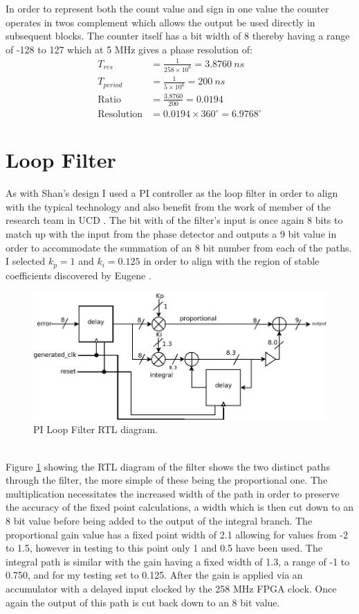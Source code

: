 \documentclass[11pt,english,british]{report}
\begin{document}
In order to represent both the count value and sign in one value the counter operates in twos complement which allows the output be used directly in subsequent blocks. The counter itself has a bit width of 8 thereby having a range of -128 to 127 which at 5 MHz gives a phase resolution of:
\begin{align*}
	T_{res} &= \frac{1}{258\times 10^6} = 3.8760~ns \\
	T_{period} &= \frac{1}{5\times 10^6} = 200~ns \\
	\textrm{Ratio} &=\frac{3.8760}{200} = 0.0194 \\
	\textrm{Resolution} & = 0.0194\times 360^\circ = 6.9768^\circ
\end{align*}

\section{Loop Filter}
As with Shan's design I used a PI controller as the loop filter in order to align with the typical technology and also benefit from the work of member of the research team in UCD \cite{shan2014phd,koskin2018generation}. %
The bit with of the filter's input is once again 8 bits to match up with the input from the phase detector and outputs a 9 bit value in order to accommodate the summation of an 8 bit number from each of the paths. I selected $k_p = 1$ and $k_i = 0.125$ in order to align with the region of stable coefficients discovered by Eugene \cite{koskin2018generation}. %
\begin{figure}[h]
	\centering
	\includegraphics[scale=0.35]{../loop_filter}
	\caption{PI Loop Filter RTL diagram.}
	\label{fig:my_pi}
\end{figure}\\
Figure \ref{fig:my_pi} showing the RTL diagram of the filter shows the two distinct paths through the filter, the more simple of these being the proportional one. The multiplication necessitates the increased width of the path in order to preserve the accuracy of the fixed point calculations, a width which is then cut down to an 8 bit value before being added to the output of the integral branch. The proportional gain value has a fixed point width of 2.1 allowing for values from -2 to 1.5, however in testing to this point only 1 and 0.5 have been used. The integral path is similar with the gain having a fixed width of 1.3, a range of -1 to 0.750, and for my testing set to 0.125. After the gain is applied via an accumulator with a delayed input clocked by the 258 MHz FPGA clock. Once again the output of this path is cut back down to an 8 bit value.\\
\end{document}
